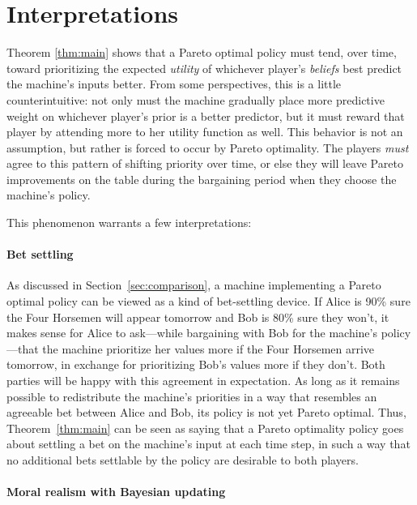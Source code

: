 \documentclass{article}
\newcommand{\thm}[1]{Theorem~\ref{thm:#1}}
\newcommand{\sect}[1]{Section~\ref{sec:#1}}
\begin{document}
\section{Interpretations}

Theorem \ref{thm:main} shows that a Pareto optimal policy must tend, over time, toward prioritizing the expected {\em utility} of whichever player's \emph{beliefs} best predict the machine's inputs better.  From some perspectives, this is a little counterintuitive: not only must the machine gradually place more predictive weight on whichever player's prior is a better predictor, but it must reward that player by attending more to her utility function as well.  This behavior is not an assumption, but rather is forced to occur by Pareto optimality.  The players \emph{must} agree to this pattern of shifting priority over time, or else they will leave Pareto improvements on the table during the bargaining period when they choose the machine's policy.  

This phenomenon warrants a few interpretations:

\paragraph{Bet settling}

As discussed in \sect{comparison}, a machine implementing a Pareto optimal policy can be viewed as a kind of bet-settling device.  If Alice is 90\% sure the Four Horsemen will appear tomorrow and Bob is 80\% sure they won't, it makes sense for Alice to ask---while bargaining with Bob for the machine's policy---that the machine prioritize her values more if the Four Horsemen arrive tomorrow, in exchange for prioritizing Bob's values more if they don't.  Both parties will be happy with this agreement in expectation.  As long as it remains possible to redistribute the machine's priorities in a way that resembles an agreeable bet between Alice and Bob, its policy is not yet Pareto optimal.  Thus, \thm{main} can be seen as saying that a Pareto optimality policy goes about settling a bet on the machine's input at each time step, in such a way that no additional bets settlable by the policy are desirable to both players.

\paragraph{Moral realism with Bayesian updating}
\end{document}
